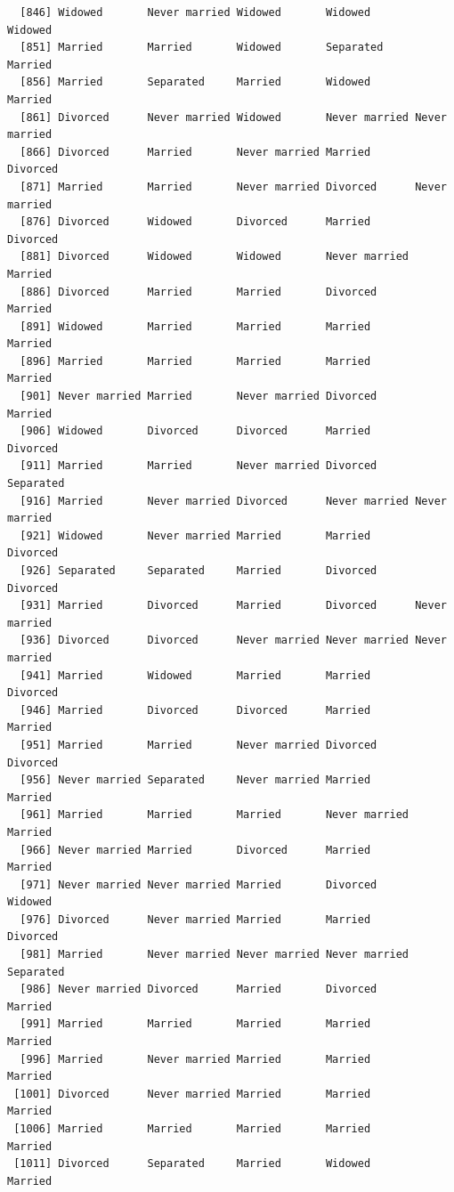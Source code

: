 \documentclass[
  letterpaper,
  DIV=11,
  numbers=noendperiod,
  oneside]{scrartcl}
\begin{document}
\begin{verbatim}
  [846] Widowed       Never married Widowed       Widowed       Widowed      
  [851] Married       Married       Widowed       Separated     Married      
  [856] Married       Separated     Married       Widowed       Married      
  [861] Divorced      Never married Widowed       Never married Never married
  [866] Divorced      Married       Never married Married       Divorced     
  [871] Married       Married       Never married Divorced      Never married
  [876] Divorced      Widowed       Divorced      Married       Divorced     
  [881] Divorced      Widowed       Widowed       Never married Married      
  [886] Divorced      Married       Married       Divorced      Married      
  [891] Widowed       Married       Married       Married       Married      
  [896] Married       Married       Married       Married       Married      
  [901] Never married Married       Never married Divorced      Married      
  [906] Widowed       Divorced      Divorced      Married       Divorced     
  [911] Married       Married       Never married Divorced      Separated    
  [916] Married       Never married Divorced      Never married Never married
  [921] Widowed       Never married Married       Married       Divorced     
  [926] Separated     Separated     Married       Divorced      Divorced     
  [931] Married       Divorced      Married       Divorced      Never married
  [936] Divorced      Divorced      Never married Never married Never married
  [941] Married       Widowed       Married       Married       Divorced     
  [946] Married       Divorced      Divorced      Married       Married      
  [951] Married       Married       Never married Divorced      Divorced     
  [956] Never married Separated     Never married Married       Married      
  [961] Married       Married       Married       Never married Married      
  [966] Never married Married       Divorced      Married       Married      
  [971] Never married Never married Married       Divorced      Widowed      
  [976] Divorced      Never married Married       Married       Divorced     
  [981] Married       Never married Never married Never married Separated    
  [986] Never married Divorced      Married       Divorced      Married      
  [991] Married       Married       Married       Married       Married      
  [996] Married       Never married Married       Married       Married      
 [1001] Divorced      Never married Married       Married       Married      
 [1006] Married       Married       Married       Married       Married      
 [1011] Divorced      Separated     Married       Widowed       Married      

\end{verbatim}
\end{document}
